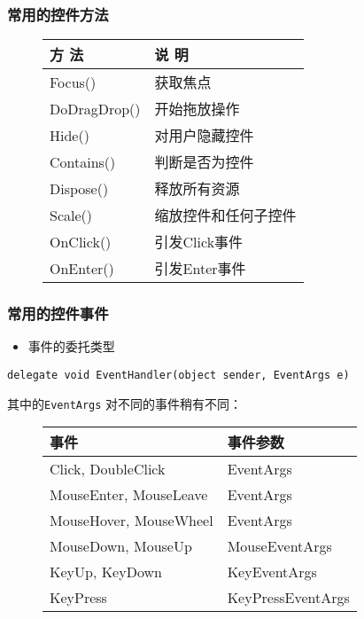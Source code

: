 \begin{frame}
\frametitle{常用的控件方法}
\begin{figure}
  \centering
  \begin{tabular}{l|l}
    \hline
    方 法        & 说 明                \\
    \hline
    Focus()      & 获取焦点             \\
    DoDragDrop() & 开始拖放操作         \\
    Hide()       & 对用户隐藏控件       \\
    \hline
    Contains()   & 判断是否为控件       \\
    Dispose()    & 释放所有资源         \\
    Scale()      & 缩放控件和任何子控件 \\
    \hline
    OnClick()    & 引发Click事件       \\
    OnEnter()    & 引发Enter事件       \\
    \hline
  \end{tabular}
\end{figure}
\end{frame}

\begin{frame}[fragile]
\frametitle{常用的控件事件}
\begin{itemize}
\item 事件的委托类型
\end{itemize}
\begin{lstlisting}
delegate void EventHandler(object sender, EventArgs e)
\end{lstlisting}
其中的\texttt{EventArgs} 对不同的事件稍有不同：
\begin{figure}[htbp]
  \centering
  \begin{tabular}{l|l}
    \hline
    事件                   & 事件参数          \\
    \hline
    Click, DoubleClick     & EventArgs         \\
    MouseEnter, MouseLeave & EventArgs         \\
    MouseHover, MouseWheel & EventArgs         \\
    MouseDown, MouseUp     & MouseEventArgs    \\
    KeyUp, KeyDown         & KeyEventArgs      \\
    KeyPress               & KeyPressEventArgs \\
    \hline
  \end{tabular}
\end{figure}
\end{frame}

